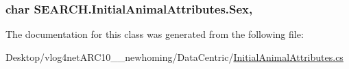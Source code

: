 \hypertarget{class_s_e_a_r_c_h_1_1_initial_animal_attributes_aacb87a569062245a6f75e83ff1eee1d1}{
\subsubsection[{Sex}]{\setlength{\rightskip}{0pt plus 5cm}char S\-E\-A\-R\-C\-H.\-Initial\-Animal\-Attributes.\-Sex\hspace{0.3cm}{\ttfamily [get]}, {\ttfamily [set]}}}\label{class_s_e_a_r_c_h_1_1_initial_animal_attributes_aacb87a569062245a6f75e83ff1eee1d1}


The documentation for this class was generated from the following file\-:\begin{DoxyCompactItemize}
\item 
Desktop/vlog4net\-A\-R\-C10\-\_\-\_\-newhoming/\-Data\-Centric/\hyperlink{_initial_animal_attributes_8cs}{Initial\-Animal\-Attributes.\-cs}\end{DoxyCompactItemize}

